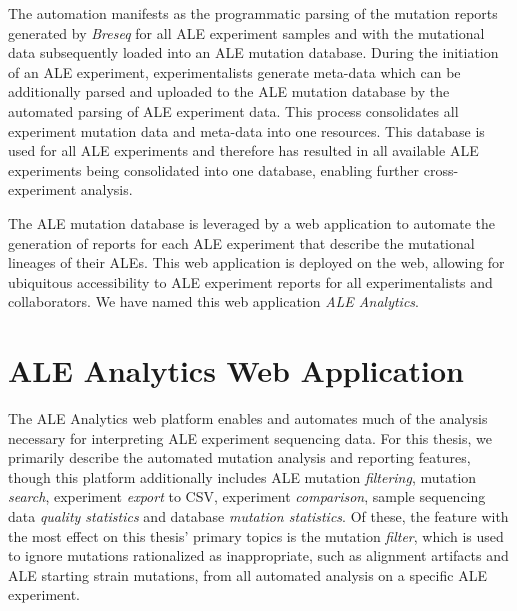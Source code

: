\documentclass[12pt,final,masters,chapterheads]{ucsd}  %
\begin{document}
The automation manifests as the programmatic parsing of the mutation reports generated by \textit{Breseq} for all ALE experiment samples and with the mutational data subsequently loaded into an ALE mutation database. During the initiation of an ALE experiment, experimentalists generate meta-data which can be additionally parsed and uploaded to the ALE mutation database by the automated parsing of ALE experiment data. This process consolidates all experiment mutation data and meta-data into one resources. This database is used for all ALE experiments and therefore has resulted in all available ALE experiments being consolidated into one database, enabling further cross-experiment analysis.

The ALE mutation database is leveraged by a web application to automate the generation of reports for each ALE experiment that describe the mutational lineages of their ALEs. This web application is deployed on the web, allowing for ubiquitous accessibility to ALE experiment reports for all experimentalists and collaborators. We have named this web application \textit{ALE Analytics}.

\section{ALE Analytics Web Application}

%
%

The ALE Analytics web platform enables and automates much of the analysis necessary for interpreting ALE experiment sequencing data. For this thesis, we primarily describe the automated mutation analysis and reporting features, though this platform additionally includes ALE mutation \textit{filtering}, mutation \textit{search}, experiment \textit{export} to CSV, experiment \textit{comparison}, sample sequencing data \textit{quality statistics} and database \textit{mutation statistics}. Of these, the feature with the most effect on this thesis' primary topics is the mutation \textit{filter}, which is used to ignore mutations rationalized as inappropriate, such as alignment artifacts and ALE starting strain mutations, from all automated analysis on a specific ALE experiment.
\end{document}
